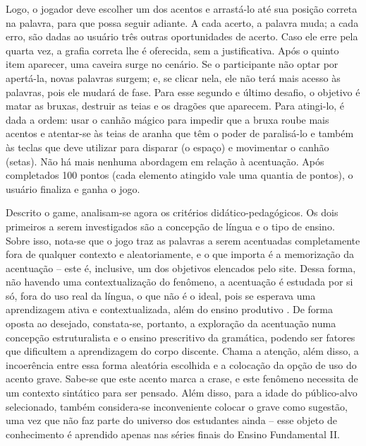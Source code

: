 \documentclass{textolivre}
\begin{document}
Logo, o jogador deve escolher um dos acentos e arrastá-lo até sua posição correta na palavra, para que possa seguir adiante. A cada acerto, a palavra muda; a cada erro, são dadas ao usuário três outras oportunidades de acerto. Caso ele erre pela quarta vez, a grafia correta lhe é oferecida, sem a justificativa. Após o quinto item aparecer, uma caveira surge no cenário. Se o participante não optar por apertá-la, novas palavras surgem; e, se clicar nela, ele não terá mais acesso às palavras, pois ele mudará de fase. Para esse segundo e último desafio, o objetivo é matar as bruxas, destruir as teias e os dragões que aparecem. Para atingi-lo, é dada a ordem: usar o canhão mágico para impedir que a bruxa roube mais acentos e atentar-se às teias de aranha que têm o poder de paralisá-lo e também às teclas que deve utilizar para disparar (o espaço) e movimentar o canhão (setas). Não há mais nenhuma abordagem em relação à acentuação. Após completados 100 pontos (cada elemento atingido vale uma quantia de pontos), o usuário finaliza e ganha o jogo.

Descrito o game, analisam-se agora os critérios didático-pedagógicos. Os dois primeiros a serem investigados são a concepção de língua e o tipo de ensino. Sobre isso, nota-se que o jogo traz as palavras a serem acentuadas completamente fora de qualquer contexto e aleatoriamente, e o que importa é a memorização da acentuação  – este é, inclusive, um dos objetivos elencados pelo site. Dessa forma, não havendo uma contextualização do fenômeno, a acentuação é estudada por si só, fora do uso real da língua, o que não é o ideal, pois se esperava uma aprendizagem ativa e contextualizada, além do ensino produtivo \cite{ribeiro2009}. De forma oposta ao desejado, constata-se, portanto, a exploração da acentuação numa concepção estruturalista \cite{costa_val1996, couto2020} e o ensino prescritivo da gramática, podendo ser fatores que dificultem a aprendizagem do corpo discente. Chama a atenção, além disso, a incoerência entre essa forma aleatória escolhida e a colocação da opção de uso do acento grave. Sabe-se que este acento marca a crase, e este fenômeno necessita de um contexto sintático para ser pensado. Além disso, para a idade do público-alvo selecionado, também considera-se inconveniente colocar o grave como sugestão, uma vez que não faz parte do universo dos estudantes ainda  – esse objeto de conhecimento é aprendido apenas nas séries finais do Ensino Fundamental II.
\end{document}
